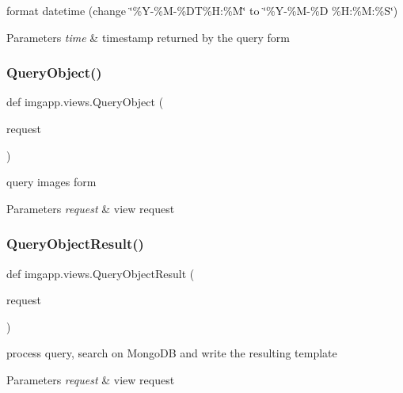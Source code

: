 format datetime (change \char`\"{}\%\+Y-\/\%\+M-\/\%\+D\+T\%\+H\+:\%\+M\char`\"{} to \char`\"{}\%\+Y-\/\%\+M-\/\%\+D \%\+H\+:\%\+M\+:\%\+S\char`\"{}) 


\begin{DoxyParams}{Parameters}
{\em time} & timestamp returned by the query form \\
\hline
\end{DoxyParams}
\mbox{\label{namespaceimgapp_1_1views_a42d42280064441dcaa48088fe3e43222}} 
\subsubsection{\texorpdfstring{Query\+Object()}{QueryObject()}}
{\footnotesize\ttfamily def imgapp.\+views.\+Query\+Object (\begin{DoxyParamCaption}\item[{}]{request }\end{DoxyParamCaption})}



query images form 


\begin{DoxyParams}{Parameters}
{\em request} & view request \\
\hline
\end{DoxyParams}
\mbox{\label{namespaceimgapp_1_1views_a06d5c0cac6ae36a355b522abb883932b}} 
\subsubsection{\texorpdfstring{Query\+Object\+Result()}{QueryObjectResult()}}
{\footnotesize\ttfamily def imgapp.\+views.\+Query\+Object\+Result (\begin{DoxyParamCaption}\item[{}]{request }\end{DoxyParamCaption})}



process query, search on Mongo\+DB and write the resulting template 


\begin{DoxyParams}{Parameters}
{\em request} & view request \\
\hline
\end{DoxyParams}
\mbox{\label{namespaceimgapp_1_1views_a6ce45040afbe69d047853cb4258a4761}} 
